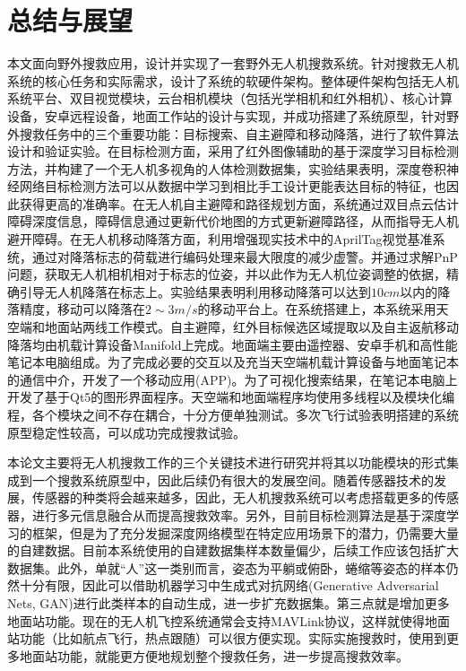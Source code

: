 \chapter{总结与展望}
\thispagestyle{fancy}

本文面向野外搜救应用，设计并实现了一套野外无人机搜救系统。针对搜救无人机系统的核心任务和实际需求，设计了系统的软硬件架构。整体硬件架构包括无人机系统平台、双目视觉模块，云台相机模块（包括光学相机和红外相机）、核心计算设备，安卓远程设备，地面工作站的设计与实现，并成功搭建了系统原型，针对野外搜救任务中的三个重要功能：目标搜索、自主避障和移动降落，进行了软件算法设计和验证实验。在目标检测方面，采用了红外图像辅助的基于深度学习目标检测方法，并构建了一个无人机多视角的人体检测数据集，实验结果表明，深度卷积神经网络目标检测方法可以从数据中学习到相比手工设计更能表达目标的特征，也因此获得更高的准确率。在无人机自主避障和路径规划方面，系统通过双目点云估计障碍深度信息，障碍信息通过更新代价地图的方式更新避障路径，从而指导无人机避开障碍。在无人机移动降落方面，利用增强现实技术中的AprilTag视觉基准系统，通过对降落标志的荷载进行编码处理来最大限度的减少虚警。并通过求解PnP问题，获取无人机相机相对于标志的位姿，并以此作为无人机位姿调整的依据，精确引导无人机降落在标志上。实验结果表明利用移动降落可以达到$10cm$以内的降落精度，移动可以降落在$2\sim3m/s$的移动平台上。在系统搭建上，本系统采用天空端和地面站两线工作模式。自主避障，红外目标候选区域提取以及自主返航移动降落均由机载计算设备Manifold上完成。地面端主要由遥控器、安卓手机和高性能笔记本电脑组成。为了完成必要的交互以及充当天空端机载计算设备与地面笔记本的通信中介，开发了一个移动应用(APP)。为了可视化搜索结果，在笔记本电脑上开发了基于Qt5的图形界面程序。天空端和地面端程序均使用多线程以及模块化编程，各个模块之间不存在耦合，十分方便单独测试。多次飞行试验表明搭建的系统原型稳定性较高，可以成功完成搜救试验。

本论文主要将无人机搜救工作的三个关键技术进行研究并将其以功能模块的形式集成到一个搜救系统原型中，因此后续仍有很大的发展空间。随着传感器技术的发展，传感器的种类将会越来越多，因此，无人机搜救系统可以考虑搭载更多的传感器，进行多元信息融合从而提高搜救效率。另外，目前目标检测算法是基于深度学习的框架，但是为了充分发掘深度网络模型在特定应用场景下的潜力，仍需要大量的自建数据。目前本系统使用的自建数据集样本数量偏少，后续工作应该包括扩大数据集。此外，单就“人”这一类别而言，姿态为平躺或俯卧，蜷缩等姿态的样本仍然十分有限，因此可以借助机器学习中生成式对抗网络(Generative Adversarial Nets, GAN)进行此类样本的自动生成，进一步扩充数据集。第三点就是增加更多地面站功能。现在的无人机飞控系统通常会支持MAVLink协议，这样就使得地面站功能（比如航点飞行，热点跟随）可以很方便实现。实际实施搜救时，使用到更多地面站功能，就能更方便地规划整个搜救任务，进一步提高搜救效率。
